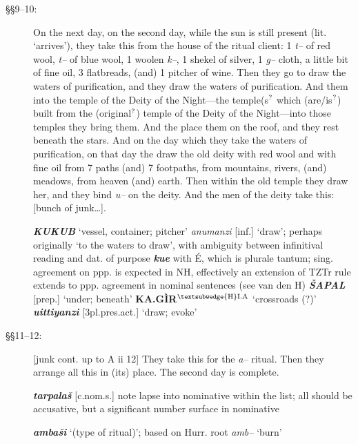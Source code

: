\documentclass[10pt]{article}
\newcommand{\supersc}[1]{$^{\textrm{\scriptsize{#1}}}$}  	%
\newcommand{\bit}[1]{\textbf{\textit{#1}}}				%
\newcommand{\p}[1]{{\tiny[{#1}]}}					%
\newcommand{\hith}{\textsubwedge{h}}
\newcommand{\Hith}{\textsubwedge{H}}
\newcommand{\hpl}{\supersc{{\Hith}I.A}}
\renewcommand{\.}[1]{\textsubdot{#1}}
\begin{document}
\begin{description}
\item[\S\S9--10:] On the next day, on the second day, while the sun is still present (lit. `arrives'), they take this from the house of the ritual client: 1 \textit{t--} of red wool, \textit{t--} of blue wool, 1 woolen \textit{k--}, 1 shekel of silver, 1 \textit{g--} cloth, a little bit of fine oil, 3 flatbreads, (and) 1 pitcher of wine. Then they go to draw the waters of purification, and they draw the waters of purification. And them into the temple of the Deity of the Night---the temple(s\supersc{?} which (are/is\supersc{?}) built from the (original\supersc{?}) temple of the Deity of the Night---into those temples they bring them. And the place them on the roof, and they rest beneath the stars. And on the day which they take the waters of purification, on that day the draw the old deity with red wool and with fine oil from 7 paths (and) 7 footpaths, from mountains, rivers, (and) meadows, from heaven (and) earth. Then within the old temple they draw her, and they bind \textit{u--} on the deity.  And the men of the deity take this: [bunch of junk{\ldots}].


\begin{notes}

\bit{KUKUB} `vessel, container; pitcher' \textit{{\hith}anumanzi} \p{inf.} `draw'; perhaps originally `to the waters to draw', with ambiguity between infinitival reading and dat. of purpose \bit{kue} with \'E, which is plurale tantum;  sing. agreement on ppp. is expected in NH, effectively an extension of TZTr rule extends to ppp. agreement in nominal sentences (see van den H) \bit{\v{S}APAL} \p{prep.} `under; beneath' \textbf{KA.G\`IR{\hpl}} `crossroads (?)' \bit{{\hith}uittiyanzi} \p{3pl.pres.act.} `draw; evoke' 

\end{notes}

\item[\S\S11--12:] {[}junk cont. up to A ii 12] They take this for the \textit{a--} ritual. Then they arrange all this in (its) place. The second day is complete.

\begin{notes}

\bit{tarpala\v{s}} \p{c.nom.s.} note lapse into nominative within the list; all should be accusative, but a significant number surface in nominative

\bit{amba\v{s}i} `(type of ritual)'; based on Hurr. root \textit{amb--} `burn'

\end{notes}


\end{description}
\end{document}
